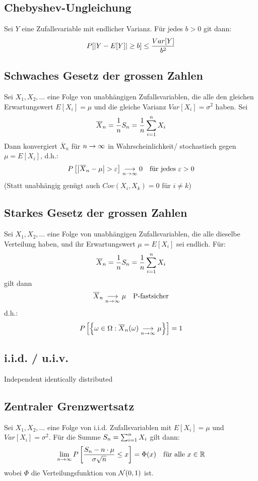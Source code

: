\subsection*{Chebyshev-Ungleichung}
Sei $Y$ eine Zufallsvariable mit endlicher Varianz. Für jedes $b > 0$ git dann:
\begin{align*}
  P[\abs{Y - E[Y]} \geq b] \leq \frac{Var[Y]}{b^2}
\end{align*}
\subsection*{Schwaches Gesetz der grossen Zahlen}
Sei $X_1, X_2, \dots$ eine Folge von unabhängigen Zufallsvariablen, die alle
den gleichen Erwartungswert $E[X_i] = \mu$ und die gleiche Varianz $Var[X_i] =
  \sigma^2$ haben. Sei
\begin{align*}
  \overline{X}_n = \frac{1}{n} S_n = \frac{1}{n} \sum_{i = 1}^n X_i
\end{align*}
Dann konvergiert $\overline{X}_n$ für $n \rightarrow \infty$ in Wahrscheinlichkeit/
stochastisch gegen $\mu = E[X_i]$, d.h.:
\begin{align*}
  P \left[ \abs{\overline{X}_n - \mu} > \varepsilon \right] \underset{n \rightarrow \infty}{\longrightarrow} 0
   &  & \text{für jedes } \varepsilon > 0
\end{align*}
(Statt unabhängig genügt auch $Cov (X_i, X_k) = 0$ für $i \neq k$)
\subsection*{Starkes Gesetz der grossen Zahlen}
Sei $X_1, X_2, \dots$ eine Folge von unabhängigen Zufallsvariablen, die alle
dieselbe Verteilung haben, und ihr Erwartungswert $\mu = E[X_i]$ sei endlich.
Für:
\begin{align*}
  \overline{X}_n = \frac{1}{n} S_n = \frac{1}{n} \sum_{i = 1}^n X_i
\end{align*}
gilt dann
\begin{align*}
  \overline{X}_n \underset{n \rightarrow \infty}{\longrightarrow} \mu &  & \text{P-fastsicher}
\end{align*}
d.h.:
\begin{align*}
  P \left[ \left\{ \omega \in \Omega : \overline{X}_n (\omega) \underset{n \rightarrow \infty}{\longrightarrow} \mu \right\} \right] = 1
\end{align*}
\subsection*{i.i.d. / u.i.v.}
Independent identically distributed
\subsection*{Zentraler Grenzwertsatz}
Sei $X_1, X_2, \dots$ eine Folge von i.i.d. Zufallsvariablen mit $E[X_i] = \mu$
und $Var[X_i] = \sigma^2$. Für die Summe $S_n = \sum_{i = 1}^n X_i$ gilt dann:
\begin{align*}
  \lim_{n \rightarrow \infty} P \left[ \frac{S_n - n \cdot \mu}{\sigma \sqrt{n}} \leq x \right] = \Phi (x)
   &  & \text{für alle } x \in \mathbb{R}
\end{align*}
wobei $\Phi$ die Verteilungsfunktion von $\mathcal{N} (0, 1)$ ist.